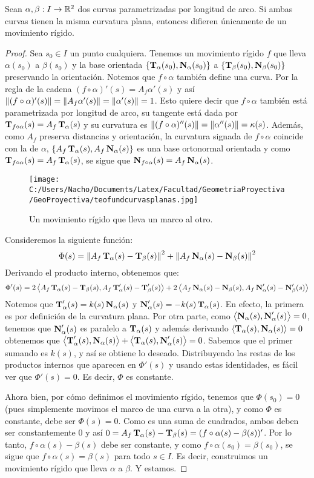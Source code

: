 \begin{teo}
Sean $\alpha,\beta:I\to\mathbb{R}^2$ dos curvas parametrizadas por longitud de arco. Si ambas curvas tienen la misma curvatura plana, entonces difieren únicamente de un movimiento rígido.
\begin{proof}
Sea $s_0\in I$ un punto cualquiera. Tenemos un movimiento rígido $f$ que lleva $\alpha(s_0)$ a $\beta(s_0)$ y la base orientada $\{\operatorname{\mathbf{T}}_\alpha(s_0),\operatorname{\mathbf{N}}_\alpha(s_0)\}$ a $\{\operatorname{\mathbf{T}}_\beta(s_0),\operatorname{\mathbf{N}}_\beta(s_0)\}$ preservando la orientación. Notemos que $f\circ\alpha$ también define una curva. Por la regla de la cadena $(f\circ\alpha)'(s)=A_f\alpha'(s)$ y así $\left\| (f\circ\alpha)'(s) \right\|=\left\| A_f\alpha'(s) \right\|=\left\| \alpha'(s) \right\|=1$. Esto quiere decir que $f\circ\alpha$ también está parametrizada por longitud de arco, su tangente está dada por $\operatorname{\mathbf{T}}_{f\circ\alpha}(s)=A_f\operatorname{\mathbf{T}}_{\alpha}(s)$ y su curvatura es $\left\| (f\circ\alpha)''(s) \right\|=\left\| \alpha''(s) \right\|=\kappa(s)$. Además, como $A_f$ preserva distancias y orientación, la curvatura signada de $f\circ\alpha$ coincide con la de $\alpha$, $\{A_f\operatorname{\mathbf{T}}_\alpha(s),A_f\operatorname{\mathbf{N}}_\alpha(s)\}$ es una base ortonormal orientada y como $\operatorname{\mathbf{T}}_{f\circ\alpha}(s)=A_f\operatorname{\mathbf{T}}_\alpha(s)$, se sigue que $\operatorname{\mathbf{N}}_{f\circ\alpha}(s)=A_f\operatorname{\mathbf{N}}_\alpha(s)$.


\begin{figure}[h]
	\centering
		\texttt{[image: C:/Users/Nacho/Documents/Latex/Facultad/GeometriaProyectiva/GeoProyectiva/teofundcurvasplanas.jpg]}
	\caption{Un movimiento rígido que lleva un marco al otro.}
	\label{fig:teofundcurvasplanas}
\end{figure}


Consideremos la siguiente función: $$\Phi(s)=\left\| A_f\operatorname{\mathbf{T}}_\alpha(s) - \operatorname{\mathbf{T}}_\beta(s) \right\|^2 + \left\| A_f\operatorname{\mathbf{N}}_\alpha(s)-\operatorname{\mathbf{N}}_\beta(s) \right\|^2$$ Derivando el producto interno, obtenemos que: $$\Phi'(s)=2\left\langle A_f\operatorname{\mathbf{T}}_\alpha(s)-\operatorname{\mathbf{T}}_\beta(s),A_f\operatorname{\mathbf{T}}'_\alpha(s)-\operatorname{\mathbf{T}}'_\beta(s) \right\rangle + 2\left\langle A_f\operatorname{\mathbf{N}}_\alpha(s)-\operatorname{\mathbf{N}}_\beta(s),A_f\operatorname{\mathbf{N}}'_\alpha(s)-\operatorname{\mathbf{N}}'_\beta(s) \right\rangle$$ Notemos que $\operatorname{\mathbf{T}}'_\alpha(s)= k(s)\operatorname{\mathbf{N}}_\alpha(s)$ y $\operatorname{\mathbf{N}}'_\alpha(s)=-k(s)\operatorname{\mathbf{T}}_\alpha(s)$. En efecto, la primera es por definición de la curvatura plana. Por otra parte, como $\left\langle \operatorname{\mathbf{N}}_\alpha(s),\operatorname{\mathbf{N}}'_\alpha(s) \right\rangle=0$, tenemos que $\operatorname{\mathbf{N}}'_\alpha(s)$ es paralelo a $\operatorname{\mathbf{T}}_\alpha(s)$ y además derivando $\left\langle \operatorname{\mathbf{T}}_\alpha(s),\operatorname{\mathbf{N}}_\alpha(s) \right\rangle=0$ obtenemos que $\left\langle \operatorname{\mathbf{T}}'_\alpha(s),\operatorname{\mathbf{N}}_\alpha(s) \right\rangle+\left\langle \operatorname{\mathbf{T}}_\alpha(s),\operatorname{\mathbf{N}}'_\alpha(s) \right\rangle = 0$. Sabemos que el primer sumando es $k(s)$, y así se obtiene lo deseado. Distribuyendo las restas de los productos internos que aparecen en $\Phi'(s)$ y usando estas identidades, es fácil ver que $\Phi'(s)=0$. Es decir, $\Phi$ es constante.

Ahora bien, por cómo definimos el movimiento rígido, tenemos que $\Phi(s_0)=0$ (pues simplemente movimos el marco de una curva a la otra), y como $\Phi$ es constante, debe ser $\Phi(s)=0$. Como es una suma de cuadrados, ambos deben ser constantemente $0$ y así $0=A_f\operatorname{\mathbf{T}}_\alpha(s)-\operatorname{\mathbf{T}}_\beta(s) = (f\circ\alpha(s)-\beta(s))'$. Por lo tanto, $f\circ\alpha(s)-\beta(s)$ debe ser constante, y como $f\circ\alpha(s_0)=\beta(s_0)$, se sigue que $f\circ\alpha(s)=\beta(s)$ para todo $s\in I$. Es decir, construimos un movimiento rígido que lleva $\alpha$ a $\beta$. Y estamos.
\end{proof}
\end{teo}

